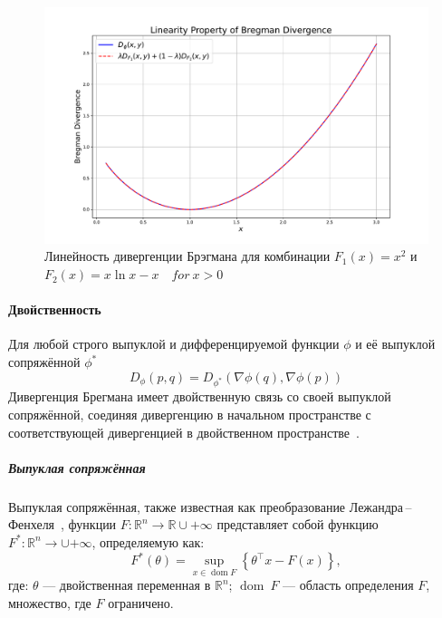 \documentclass[12pt]{scrartcl}
\begin{document}
\begin{figure}[h]
    \centering
    \includegraphics[width=\textwidth]{linearity.pdf} %
    \caption{Линейность дивергенции Брэгмана для комбинации $F_{1}(x) = x^{2}$ и $F_{2}(x) = x \ln x - x \quad for\ x > 0$}
    \label{fig:linearity}
\end{figure}

\paragraph{Двойственность}\label{par:duality}
Для любой строго выпуклой и дифференцируемой функции $\phi$ и её выпуклой сопряжённой $\phi^{*}$
\begin{equation}
    D_{\phi}(p,q) = D_{\phi^{*}}(\nabla \phi(q), \nabla \phi(p))
\end{equation}
Дивергенция Брегмана имеет двойственную связь со своей выпуклой сопряжённой, соединяя дивергенцию в начальном пространстве с соответствующей дивергенцией в двойственном пространстве~\cite{Nielsen2019}.

\subparagraph{Выпуклая сопряжённая}

Выпуклая сопряжённая, также известная как преобразование Лежандра\,--\,Фенхеля~\cite{Touchette2005}, функции $F: \mathbb{R}^{n} \rightarrow \mathbb{R} \cup {+\infty}$ представляет собой функцию $F^{*}: \mathbb{R}^{n} \rightarrow \cup {+\infty}$, определяемую как:
\begin{equation}
    F^{*}(\theta) = \sup_{x \in \operatorname{dom} F} \left\{ \theta^\top x - F(x) \right\},
\end{equation}
где: $\theta$ --- двойственная переменная в $\mathbb{R}^{n}$; $\operatorname{dom}\ F$ --- область определения $F$, множество, где $F$ ограничено.
\end{document}
